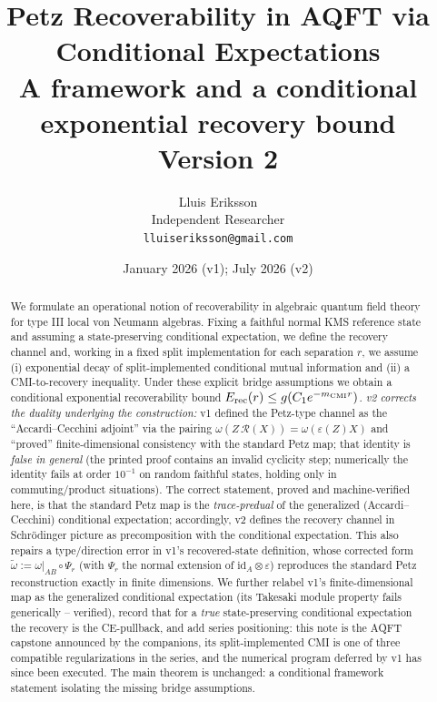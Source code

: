\documentclass[11pt]{article}
\title{Petz Recoverability in AQFT via Conditional Expectations\\
{\large A framework and a conditional exponential recovery bound}\\
{\normalsize Version 2}}
\author{Lluis Eriksson\\ Independent Researcher\\ \texttt{lluiseriksson@gmail.com}}
\date{January 2026 (v1); July 2026 (v2)}
\theoremstyle{remark}
\newcommand{\Erec}{E_{\rm rec}}
\begin{document}
\maketitle

\begin{abstract}
We formulate an operational notion of recoverability in algebraic quantum
field theory for type III local von Neumann algebras. Fixing a faithful
normal KMS reference state and assuming a state-preserving conditional
expectation, we define the recovery channel and, working in a fixed split
implementation for each separation $r$, we assume (i) exponential decay of
split-implemented conditional mutual information and (ii) a
CMI-to-recovery inequality. Under these explicit bridge assumptions we
obtain a conditional exponential recoverability bound $\Erec(r) \le
g(C_1 e^{-m_{\rm CMI} r})$. \emph{v2 corrects the duality underlying the
construction:} v1 defined the Petz-type channel as the
``Accardi--Cecchini adjoint'' via the pairing $\omega(Z\,\mathcal{R}(X))
= \omega(\varepsilon(Z)X)$ and ``proved'' finite-dimensional consistency
with the standard Petz map; that identity is \emph{false in general} (the
printed proof contains an invalid cyclicity step; numerically the
identity fails at order $10^{-1}$ on random faithful states, holding only
in commuting/product situations). The correct statement, proved and
machine-verified here, is that the standard Petz map is the
\emph{trace-predual} of the generalized (Accardi--Cecchini) conditional
expectation; accordingly, v2 defines the recovery channel in
Schr\"odinger picture as precomposition with the conditional expectation.
This also repairs a type/direction error in v1's recovered-state
definition, whose corrected form $\tilde\omega := \omega|_{AB} \circ
\Psi_r$ (with $\Psi_r$ the normal extension of $\mathrm{id}_A \otimes
\varepsilon$) reproduces the standard Petz reconstruction exactly in
finite dimensions. We further relabel v1's finite-dimensional map as the
generalized conditional expectation (its Takesaki module property fails
generically -- verified), record that for a \emph{true} state-preserving
conditional expectation the recovery is the CE-pullback, and add series
positioning: this note is the AQFT capstone announced by the companions,
its split-implemented CMI is one of three compatible regularizations in
the series, and the numerical program deferred by v1 has since been
executed. The main theorem is unchanged: a conditional framework
statement isolating the missing bridge assumptions.
\end{abstract}
\end{document}
